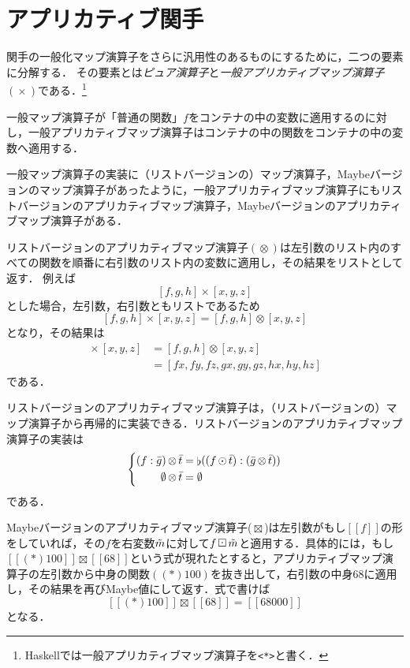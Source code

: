 \documentclass[twocolumn]{jsbook}
\def\[{\left[\!\left[}
\def\]{\right]\!\right]}
\newcommand{\programminglanguage}[1]{\textsf{#1}}
\newcommand{\haskell}{\programminglanguage{Haskell}}
\newcommand{\code}[1]{\texttt{#1}}
\newcommand{\keyword}[1]{{\emph{#1}}}
\DeclareMathOperator{\hsklApplicativeMap}{\times}
\DeclareMathOperator{\hsklApplicativeListMap}{\otimes}
\DeclareMathOperator{\hsklApplicativeMaybeMap}{\boxtimes}
\DeclareMathOperator{\hsklConcat}{\flat}
\DeclareMathOperator{\hsklMap}{\odot}
\DeclareMathOperator{\hsklMaybeMap}{\boxdot}
\newcommand{\hsklEmptyList}{\emptyset}
\newcommand{\hsklJust}[1]{\[#1\]}
\newcommand{\hsklList}[1]{\Bar{#1}}
\newcommand{\hsklMaybe}[1]{\Tilde{#1}}
\begin{document}
\section{アプリカティブ関手}

関手の一般化マップ演算子をさらに汎用性のあるものにするために，二つの要素に分解する．
その要素とは\keyword{ピュア演算子}と\keyword{一般アプリカティブマップ演算子} $(\hsklApplicativeMap)$である．\footnote{\haskell では一般アプリカティブマップ演算子を\code{<*>}と書く．}

一般マップ演算子が「普通の関数」$f$をコンテナの中の変数に適用するのに対し，一般アプリカティブマップ演算子はコンテナの中の関数をコンテナの中の変数へ適用する．

一般マップ演算子の実装に（リストバージョンの）マップ演算子，Maybeバージョンのマップ演算子があったように，一般アプリカティブマップ演算子にもリストバージョンのアプリカティブマップ演算子，Maybeバージョンのアプリカティブマップ演算子がある．

リストバージョンのアプリカティブマップ演算子$(\hsklApplicativeListMap)$は左引数のリスト内のすべての関数を順番に右引数のリスト内の変数に適用し，その結果をリストとして返す．
例えば$$[f,g,h]\hsklApplicativeMap[x,y,z]$$とした場合，左引数，右引数ともリストであるため$$[f,g,h]\hsklApplicativeMap[x,y,z]=[f,g,h]\hsklApplicativeListMap[x,y,z]$$となり，その結果は
\begin{align*}
[f,g,h]\hsklApplicativeMap[x,y,z]&=[f,g,h]\hsklApplicativeListMap[x,y,z]\\
&=[fx,fy,fz,gx,gy,gz,hx,hy,hz]
\end{align*}
である．

リストバージョンのアプリカティブマップ演算子は，（リストバージョンの）マップ演算子から再帰的に実装できる．リストバージョンのアプリカティブマップ演算子の実装は
\begin{equation*}
\left\{
\begin{split}
(f:\hsklList{g})\hsklApplicativeListMap\hsklList{t}&=\hsklConcat((f\hsklMap\hsklList{t}):(\hsklList{g}\hsklApplicativeListMap\hsklList{t}))\\
\hsklEmptyList\hsklApplicativeListMap\hsklList{t}&=\hsklEmptyList
\end{split}
\right.
\end{equation*}
である．

Maybeバージョンのアプリカティブマップ演算子($\hsklApplicativeMaybeMap$)は左引数がもし$\hsklJust{f}$の形をしていれば，その$f$を右変数$\hsklMaybe{m}$に対して$f\hsklMaybeMap\hsklMaybe{m}$と適用する．具体的には，もし$\hsklJust{(*)100}\hsklApplicativeMaybeMap{}\hsklJust{68}$という式が現れたとすると，アプリカティブマップ演算子の左引数から中身の関数$((*)100)$を抜き出して，右引数の中身$68$に適用し，その結果を再びMaybe値にして返す．式で書けば$$\hsklJust{(*)100}\hsklApplicativeMaybeMap{}\hsklJust{68}=\hsklJust{68000}$$となる．
\end{document}
